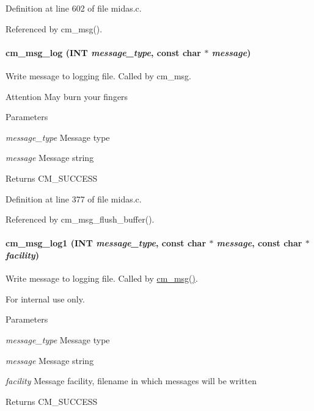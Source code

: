 Definition at line 602 of file midas.c.

Referenced by cm\_\-msg().
\paragraph[{cm\_\-msg\_\-log}]{ cm\_\-msg\_\-log ({\bf INT} {\em message\_\-type}, \/  const char $\ast$ {\em message})}\hfill\label{group__msgfunctionc_gadac7f1f490117d6cdd4fc39bd7f9d0d5}
Write message to logging file. Called by cm\_\-msg. \begin{DoxyAttention}{Attention}
May burn your fingers 
\end{DoxyAttention}

\begin{DoxyParams}{Parameters}
\item[{\em message\_\-type}]Message type \item[{\em message}]Message string \end{DoxyParams}
\begin{DoxyReturn}{Returns}
CM\_\-SUCCESS 
\end{DoxyReturn}


Definition at line 377 of file midas.c.

Referenced by cm\_\-msg\_\-flush\_\-buffer().
\paragraph[{cm\_\-msg\_\-log1}]{ cm\_\-msg\_\-log1 ({\bf INT} {\em message\_\-type}, \/  const char $\ast$ {\em message}, \/  const char $\ast$ {\em facility})}\hfill\label{group__msgfunctionc_gacc533051c0100cc554cd28314079e71c}
Write message to logging file. Called by \hyperlink{group__msgfunctionc_gaac032ca2438c47466bfc9722de6746ea}{cm\_\-msg()}. \begin{DoxyInternal}{For internal use only.}

\begin{DoxyParams}{Parameters}
\item[{\em message\_\-type}]Message type \item[{\em message}]Message string \item[{\em facility}]Message facility, filename in which messages will be written \end{DoxyParams}
\begin{DoxyReturn}{Returns}
CM\_\-SUCCESS 
\end{DoxyReturn}
\end{DoxyInternal}


